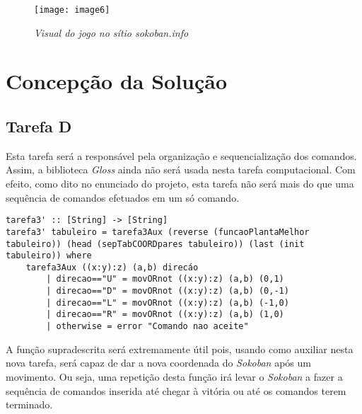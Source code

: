 \documentclass[a4paper,12pt]{report}
\begin{document}
\begin{figure}[h]
	\centering
	\texttt{[image: image6]}
	\caption{\small\sl Visual do jogo no sítio {\sf sokoban.info}}
	\captionsetup[figure]{list=yes}
\end{figure}





\chapter{Concepção da Solução}

\section{Tarefa D}

Esta tarefa será a responsável pela organização e sequencialização dos comandos. Assim, a biblioteca {\sl Gloss} ainda não será usada nesta tarefa computacional. Com efeito, como dito no enunciado do projeto, esta tarefa não será mais do que uma sequência de comandos efetuados em um só comando.
\\
\begin{lstlisting}[caption={\small\sl Função {\footnotesize\tt tarefa3'} que dado o tabuleiro, as coordenadas das caixas, do Sokoban e um movimento (U,D,L,R) devolve um par de inteiros com as novas coordenadas do Sokoban.\/}]
tarefa3' :: [String] -> [String]
tarefa3' tabuleiro = tarefa3Aux (reverse (funcaoPlantaMelhor tabuleiro)) (head (sepTabCOORDpares tabuleiro)) (last (init tabuleiro)) where 
	tarefa3Aux ((x:y):z) (a,b) direcáo 
		| direcao=="U" = movORnot ((x:y):z) (a,b) (0,1)
		| direcao=="D" = movORnot ((x:y):z) (a,b) (0,-1)
		| direcao=="L" = movORnot ((x:y):z) (a,b) (-1,0)
		| direcao=="R" = movORnot ((x:y):z) (a,b) (1,0)
		| otherwise = error "Comando nao aceite"
\end{lstlisting}

A função supradescrita será extremamente útil pois, usando como auxiliar nesta nova tarefa, será capaz de dar a nova coordenada do {\sl Sokoban} após um movimento. Ou seja, uma repetição desta função irá levar o {\sl Sokoban} a fazer a sequência de comandos inserida até chegar à vitória ou até os comandos terem terminado.
\end{document}
